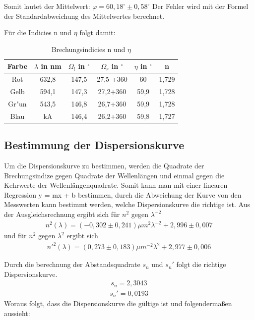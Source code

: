Somit lautet der Mittelwert:
$\varphi = 60, 18^\circ \pm 0, 58^\circ$ Der Fehler wird mit der Formel der Standardabweichung des Mittelwertes
berechnet.

Für die Indicies n und $\eta$ folgt damit:
\begin{table}[h]
\begin{center}
\begin{tabular}[c]{|c|c|c|c|c|c|} \hline
Farbe & $\lambda$ in nm & $\Omega_l$  in $^\circ$ & $\Omega_r$  in $^\circ$ & $\eta$  in $^\circ$ & n \\ \hline
Rot & 632,8 & 147,5 & 27,5 +360 & 60 & 1,729\\
Gelb & 594,1 & 147,3 & 27,2+360 & 59,9 & 1,728\\
Gr"un & 543,5 & 146,8 & 26,7+360 & 59,9 & 1,728\\
Blau & kA & 146,4 & 26,2+360 &  59,8 & 1,727\\ \hline
\end{tabular}
\caption{Brechungsindicies n und $\eta$}
\end{center}
\end{table}

\subsection{Bestimmung der Dispersionskurve}

Um die Dispersionskurve zu bestimmen, werden die Quadrate der Brechungsindize
gegen Quadrate der Wellenlängen und einmal gegen die Kehrwerte der Wellenlängenquadrate.
Somit kann man mit einer linearen Regression y = mx + b bestimmen, durch die Abweichung der
Kurve von den Messwerten kann bestimmt werden, welche Dispersionskurve die richtige ist.
Aus der Ausgleichsrechnung ergibt sich für $n^2$ gegen $\lambda^{-2}$ 
 \begin{align}
n^2( \lambda ) = (-0,302 \pm 0,241) \mu m^{2} \lambda^{-2} + 2,996 \pm 0,007\nonumber
\end{align}
und für $n^2$ gegen $\lambda^2$ ergibt sich
\begin{align}
n'^2( \lambda ) = (0,273 \pm 0,183) \mu m^{-2} \lambda^2 + 2,977 \pm 0,006 \nonumber
\end{align}

Durch die berechnung der Abstandsquadrate $s_n$ und $s_n'$ folgt die richtige Dispersionskurve.
 \begin{align}
s_n=2,3043\nonumber
\end{align}
\begin{align}
s_n'=0,0193\nonumber
\end{align}
Woraus folgt, dass die Dispersionskurve die gültige ist und folgendermaßen aussieht:

